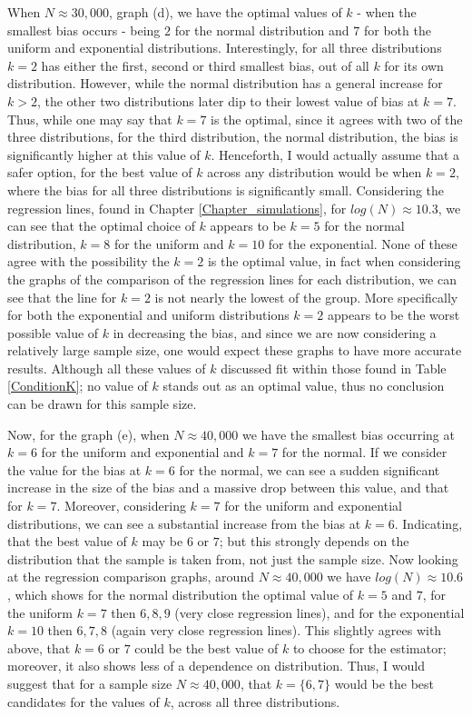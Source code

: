 \documentclass[12pt]{report}
\begin{document}
When $N \approx 30,000$, graph (d), we have the optimal values of $k$ - when the smallest bias occurs - being $2$ for the normal distribution and $7$ for both the uniform and exponential distributions. Interestingly, for all three distributions $k=2$ has either the first, second or third smallest bias, out of all $k$ for its own distribution. However, while the normal distribution has a general increase for $k > 2$, the other two distributions later dip to their lowest value of bias at $k=7$. Thus, while one may say that $k=7$ is the optimal, since it agrees with two of the three distributions, for the third distribution, the normal distribution, the bias is significantly higher at this value of $k$. Henceforth, I would actually assume that a safer option, for the best value of $k$ across any distribution would be when $k=2$, where the bias for all three distributions is significantly small. Considering the regression lines, found in Chapter \ref{Chapter_simulations}, for $log(N) \approx 10.3$, we can see that the optimal choice of $k$ appears to be $k=5$ for the normal distribution, $k=8$ for the uniform and $k=10$ for the exponential. None of these agree with the possibility the $k=2$ is the optimal value, in fact when considering the graphs of the comparison of the regression lines for each distribution, we can see that the line for $k=2$ is not nearly the lowest of the group. More specifically for both the exponential and uniform distributions $k=2$ appears to be the worst possible value of $k$ in decreasing the bias, and since we are now considering a relatively large sample size, one would expect these graphs to have more accurate results. Although all these values of $k$ discussed fit within those found in Table \ref{ConditionK}; no value of $k$ stands out as an optimal value, thus no conclusion can be drawn for this sample size.


Now, for the graph (e), when $N \approx 40,000$ we have the smallest bias occurring at $k=6$ for the uniform and exponential and $k=7$ for the normal. If we consider the value for the bias at $k=6$ for the normal, we can see a sudden significant increase in the size of the bias and a massive drop between this value, and that for $k=7$. Moreover, considering $k=7$ for the uniform and exponential distributions, we can see a substantial increase from the bias at $k=6$. Indicating, that the best value of $k$ may be $6$ or $7$; but this strongly depends on the distribution that the sample is taken from, not just the sample size. Now looking at the regression comparison graphs, around $N \approx 40,000$ we have $log(N) \approx 10.6$, which shows for the normal distribution the optimal value of $k=5$ and $7$, for the uniform $k=7$ then $6, 8, 9$ (very close regression lines), and for the exponential $k=10$ then $6, 7, 8$ (again very close regression lines). This slightly agrees with above, that $k=6$ or $7$ could be the best value of $k$ to choose for the estimator; moreover, it also shows less of a dependence on distribution. Thus, I would suggest that for a sample size $N \approx 40,000$, that $k= \{6, 7\}$ would be the best candidates for the values of $k$, across all three distributions.
\end{document}
